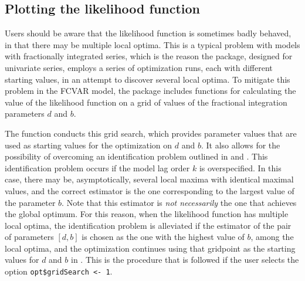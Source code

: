 \documentclass[article]{jss}
\newcommand{\fct}[1]{\code{#1()}}
\begin{document}
\subsection{Plotting the likelihood function} \label{sec:extensions}

Users should be aware that the likelihood function is sometimes badly behaved, 
in that there may be multiple local optima. 
This is a typical problem with models with fractionally integrated series, 
which is the reason the  package, designed for univariate series, 
employs a series of optimization runs, each with different starting values, 
in an attempt to discover several local optima. 
% 
To mitigate this problem in the FCVAR model, the  package includes functions for 
calculating the value of the likelihood function on a grid of values of the fractional integration parameters $d$ and $b$. 


The function \fct{FCVARlikeGrid} conducts this grid search, 
which provides parameter values that are used as starting values for the optimization on $d$ and $b$. 
It also allows for the possibility of overcoming an identification problem outlined in 
\citet[Section 2.3]{johniel2010} and \cite{Carlini2014}. 
% 
This identification problem occurs if the model lag order $k$ is overspecified. 
In this case, there may be, asymptotically, several local maxima with identical maximal values, 
and the correct estimator is the one corresponding to the largest value of the parameter $b$. 
%
Note that this estimator is \emph{not necessarily} the one that achieves the global optimum. 
% 
For this reason, when the likelihood function has multiple local optima, 
the identification problem is alleviated if the estimator of the pair of parameters $[d, b]$ is chosen as
the one with the highest value of $b$, among the local optima, 
and the optimization continues using that gridpoint as the starting values for $d$ and $b$ in \fct{FCVARestn}. 
This is the procedure that is followed if the user selects the option \verb|opt$gridSearch <- 1|.
\end{document}
